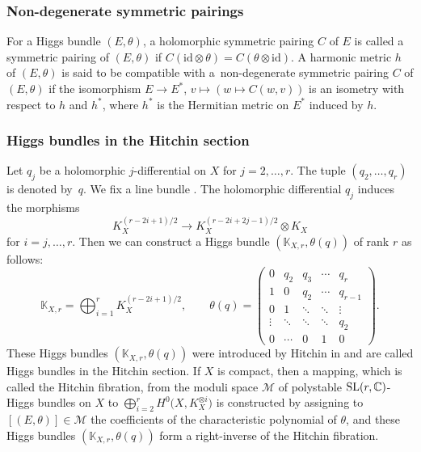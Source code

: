 \documentclass[10pt,a4paper]{amsart}
\numberwithin{equation}{section}
\newcommand{\id}{\mathrm{id}}
\begin{document}
\subsubsection{Non-degenerate symmetric pairings}
For a Higgs bundle $(E,\theta)$, a holomorphic symmetric pairing $C$ of $E$ is called a symmetric pairing of $(E,\theta)$ if $C(\id\otimes\theta) = C(\theta\otimes \id)$. A harmonic metric $h$ of $(E,\theta)$ is said to be compatible with a~non-degenerate symmetric pairing $C$ of $(E,\theta)$ if the isomorphism $E\to E^{*}$, $v\mapsto (w\mapsto C(w,v))$ is an isometry with respect to $h$ and $h^{*}$, where $h^{*}$ is the Hermitian metric on $E^{*}$ induced by $h$.

\subsubsection{Higgs bundles in the Hitchin section}
Let $q_j$ be a holomorphic $j$-differential on $X$ for $j=2,\ldots,r$. The tuple $(q_2,\dots,q_r)$ is denoted by~$q$. We fix a line bundle . The holomorphic differential $q_j$ induces the morphisms
\begin{equation*}
 K_X ^{(r-2i+1)/2} \longrightarrow K_X ^{(r-2i+2j-1)/2}\otimes K_X
\end{equation*}
for $i=j,\ldots,r$. Then we can construct a Higgs bundle $(\mathbb{K}_{X,r},\theta(q))$ of rank $r$ as follows:
\begin{equation*}
 \mathbb{K}_{X,r} = \bigoplus_{i=1}^r K_X^{(r-2i+1)/2},\qquad
 \theta(q) =
 \begin{pmatrix}
 0 & q_2 & q_3 &\cdots & q_r \\
 1 & 0 & q_2 & \cdots & q_{r-1} \\
 0 & 1 & \ddots & \ddots & \vdots \\
 \vdots & \ddots & \ddots & \ddots & q_2 \\
 0 & \cdots & 0 & 1 & 0
\end{pmatrix}.
\end{equation*}
These Higgs bundles $(\mathbb{K}_{X,r},\theta(q))$ were introduced by Hitchin in \cite{Hi2} and are called Higgs bundles in the Hitchin section. If $X$ is compact, then a mapping, which is called the Hitchin fibration, from the moduli space $\mathcal{M}$ of polystable ${\rm SL}(r,\mathbb{C})$-Higgs bundles on $X$ to $\bigoplus_{i=2}^r H^0\bigl(X,K_X^{\otimes i}\bigr)$ is constructed by assigning to $[(E,\theta)] \in \mathcal{M}$ the coefficients of the characteristic polynomial of $\theta$, and these Higgs bundles $(\mathbb{K}_{X,r},\theta(q))$ form a right-inverse of the Hitchin fibration.
\end{document}
